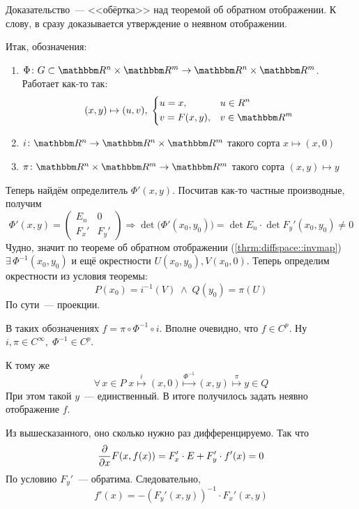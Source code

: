 \documentclass[12pt,trimbord]{../../../notes}
\begin{document}
\begin{ittproof}
  Доказательство~--- <<обёртка>> над теоремой об обратном отображении. 
  К слову, в \cite[c.~673]{zorich1} сразу доказывается утверждение о неявном отображении.

  Итак, обозначения:
  \begin{enumerate}
    \item $\Phi\colon G \subset \R^n\times\R^m \to \R^n\times\R^m$. Работает как-то так:
      \[
        (x, y) \mapsto (u, v) , \;
        \begin{dcases}
          u = x, & u \in R^n \\
          v = F(x,y) , & v\in \R^m
        \end{dcases}
      \]
    \item $i\colon \R^n \to \R^n \times \R^m$ такого сорта $x \mapsto (x, 0)$
    \item $\pi \colon \R^n \times \R^m \to \R^m$ такого сорта $(x,y) \mapsto y$
  \end{enumerate}

  Теперь найдём определитель $\Phi'(x,y)$. Посчитав как-то частные производные, получим
  \[
    \Phi'(x,y) = 
    \left(
      \begin{array}{c|c}
        E_n    & 0 \\
        \hline
        F_x'   &  F_y'
      \end{array}
    \right) \Rightarrow \det \bigl(\Phi'(x_0,y_0) \bigr) = \det E_n \cdot \det F_y'(x_0, y_0) \neq 0
  \]
  Чудно, значит по теореме об обратном отображении (\ref{thrm:diffspace::invmap}) 
  $\exists\, \Phi^{-1}(x_0, y_0)$ и ещё окрестности $U(x_0, y_0), V(x_0, 0)$.
  Теперь определим окрестности из условия теоремы:
  \[
    P(x_0) = i^{-1}(V) \; \land \; Q(y_0) = \pi(U)
  \]
  По сути~--- проекции.
  
  В таких обозначениях $f = \pi \circ \Phi^{-1} \circ i$. Вполне очевидно, что $f \in C^p$.
  Ну $i, \pi \in C^\infty, \; \Phi^{-1} \in C^p$. 

  К тому же
  \[
    \forall\, x \in P \; x \overset{i}{\mapsto} (x, 0) \overset{\Phi^{-1}}{\mapsto} (x,y) 
    \overset{\pi}{\mapsto} y \in Q 
  \]
  При этом такой $y$~--- единственный. В итоге получилось задать неявно отображение $f$.

  Из вышесказанного, оно сколько нужно раз дифференцируемо. Так что
  \[
    \frac{\partial }{\partial x} F(x, f(x)) = F_x' \cdot E + F_y' \cdot f'(x) = 0
  \]
  По условию $F_y'$~--- обратима. Следовательно,
  \[
    f'(x) = - (F_y'(x,y))^{-1} \cdot F_x'(x,y)
  \]
  
\end{ittproof}
\end{document}
